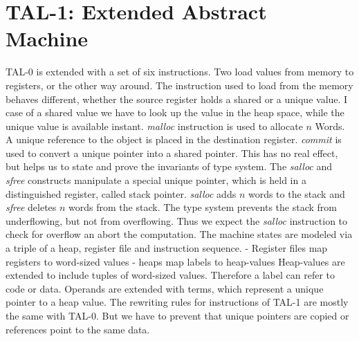 \documentclass[acmlarge]{acmart}
\begin{document}
	\section{TAL-1: Extended Abstract Machine}
	TAL-0 is extended with a set of six instructions.
	Two load values from memory to registers, or the other way around.
	The instruction used to load from the memory behaves different, whether the source register holds a shared or a unique value. I case of a shared value we have to look up the value in the heap space, while the unique value is available instant.
	\emph{malloc} instruction is used to allocate $n$ Words. A unique reference to the object is placed in the destination register. 
	\emph{commit} is used to convert a unique pointer into a shared pointer. This has no real effect, but helps us to state and prove the invariants of type system. The \emph{salloc} and \emph{sfree} constructs manipulate a special unique pointer, which is held in a distinguished register, called stack pointer. \emph{salloc} adds $n$ words to the stack and \emph{sfree} deletes $n$ words from the stack. The type system prevents the stack from underflowing, but not from overflowing.
	Thus we expect the \emph{salloc} instruction to check for overflow an abort the computation.
	The machine states are modeled via a triple of a heap, register file and instruction sequence. 
	- Register files map registers to word-sized values
	- heaps map labels to heap-values
	Heap-values are extended to include tuples of word-sized values. Therefore a label can refer to code or data.
	Operands are extended with terms, which represent a unique pointer to a heap value.
	The rewriting rules for instructions of TAL-1 are mostly the same with TAL-0. But we have to prevent that unique pointers are copied or references point to the same data. 
	
	
	
	
	
	
	
\end{document}
